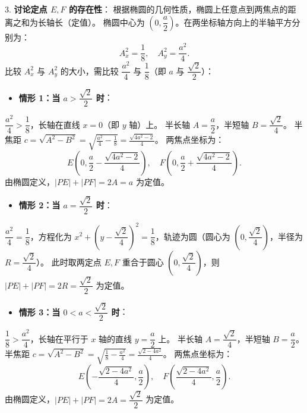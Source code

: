 \begin{answer}
3. \textbf{讨论定点 $E, F$ 的存在性}：
   根据椭圆的几何性质，椭圆上任意点到两焦点的距离之和为长轴长（定值）。
   椭圆中心为 $\left(0, \dfrac{a}{2}\right)$。在两坐标轴方向上的半轴平方分别为：
\nopagebreak[4]
\[A_x^2 = \frac{1}{8}, \quad A_y^2 = \frac{a^2}{4}.\]
   比较 $A_x^2$ 与 $A_y^2$ 的大小，需比较 $\dfrac{a^2}{4}$ 与 $\dfrac{1}{8}$（即 $a$ 与 $\dfrac{\sqrt{2}}{2}$）：
\begin{itemize}
\item \textbf{情形 1：当 $a > \dfrac{\sqrt{2}}{2}$ 时}：
\end{itemize}
     $\dfrac{a^2}{4} > \dfrac{1}{8}$，长轴在直线 $x = 0$（即 $y$ 轴）上。
     半长轴 $A = \dfrac{a}{2}$，半短轴 $B = \dfrac{\sqrt{2}}{4}$。
     半焦距 $c = \sqrt{A^2 - B^2} = \sqrt{\frac{a^2}{4} - \frac{1}{8}} = \frac{\sqrt{4a^2 - 2}}{4}$。
     两焦点坐标为：
\nopagebreak[4]
\[E\left(0, \frac{a}{2} - \frac{\sqrt{4a^2 - 2}}{4}\right), \quad F\left(0, \frac{a}{2} + \frac{\sqrt{4a^2 - 2}}{4}\right).\]
     由椭圆定义，$|PE| + |PF| = 2A = a$ 为定值。
\begin{itemize}
\item \textbf{情形 2：当 $a = \dfrac{\sqrt{2}}{2}$ 时}：
\end{itemize}
     $\dfrac{a^2}{4} = \dfrac{1}{8}$，方程化为 $x^2 + \left(y - \dfrac{\sqrt{2}}{4}\right)^2 = \dfrac{1}{8}$，轨迹为圆（圆心为 $\left(0, \dfrac{\sqrt{2}}{4}\right)$，半径为 $R = \dfrac{\sqrt{2}}{4}$）。
     此时取两定点 $E, F$ 重合于圆心 $\left(0, \dfrac{\sqrt{2}}{4}\right)$，则 $|PE| + |PF| = 2R = \dfrac{\sqrt{2}}{2}$ 为定值。
\begin{itemize}
\item \textbf{情形 3：当 $0 < a < \dfrac{\sqrt{2}}{2}$ 时}：
\end{itemize}
     $\dfrac{1}{8} > \dfrac{a^2}{4}$，长轴在平行于 $x$ 轴的直线 $y = \dfrac{a}{2}$ 上。
     半长轴 $A = \dfrac{\sqrt{2}}{4}$，半短轴 $B = \dfrac{a}{2}$。
     半焦距 $c = \sqrt{A^2 - B^2} = \sqrt{\frac{1}{8} - \frac{a^2}{4}} = \frac{\sqrt{2 - 4a^2}}{4}$。
     两焦点坐标为：
\nopagebreak[4]
\[E\left(-\frac{\sqrt{2 - 4a^2}}{4}, \frac{a}{2}\right), \quad F\left(\frac{\sqrt{2 - 4a^2}}{4}, \frac{a}{2}\right).\]
     由椭圆定义，$|PE| + |PF| = 2A = \dfrac{\sqrt{2}}{2}$ 为定值。


\end{answer}
